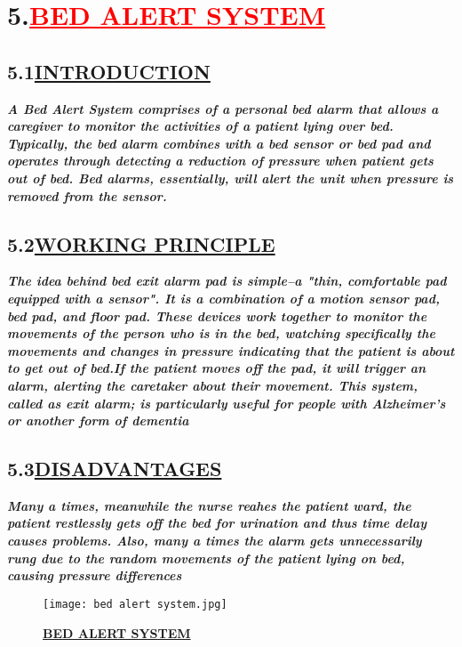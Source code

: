 \documentclass[12pt]{article}
\begin{document}
\section*{\textbf{5.\hspace{1cm}\textcolor{red}{\underline{\huge{BED ALERT SYSTEM}}}}}
\vspace{1cm}
\subsection*{\hspace{1cm}\textbf{5.1\hspace{1cm}\underline{\LARGE{INTRODUCTION}}}}
\hspace{1cm}\large{\emph{\textbf{ A Bed Alert System comprises of a personal bed alarm that allows a caregiver to monitor the activities of a patient lying over bed. Typically, the bed alarm combines with a bed sensor or bed pad and operates through detecting a reduction of pressure when patient gets out of bed. Bed alarms, essentially, will alert the unit when pressure is removed from the sensor.}}}
\vspace{2cm}
\subsection*{\hspace{1cm}\textbf{5.2\hspace{1cm}\underline{\LARGE{WORKING PRINCIPLE}}}}
\hspace{1cm}\large{\emph{\textbf{The idea behind bed exit alarm pad is simple–a "thin, comfortable pad equipped with a sensor". It is a combination of a motion sensor pad, bed pad, and floor pad. These devices work together to monitor the movements of the person who is in the bed, watching specifically the movements and changes in pressure indicating that the patient is about to get out of bed.If the patient moves off the pad, it will trigger an alarm, alerting the caretaker about their movement. This system, called as exit alarm; is particularly useful for people with Alzheimer's or another form of dementia}}}
\newpage
\subsection*{\hspace{1cm}\textbf{5.3\hspace{1cm}\underline{\LARGE{DISADVANTAGES}}}}
\hspace{1cm}\large{\emph{\textbf{Many a times, meanwhile the nurse reahes the patient ward, the patient restlessly gets off the bed for urination and thus time delay causes problems. Also, many a times the alarm gets unnecessarily rung due to the random movements of the patient lying on bed, causing pressure differences}}}
\begin{figure}
    \centering
    \texttt{[image: bed alert system.jpg]}
    \caption{\textbf{\underline{BED ALERT SYSTEM}}}
    \label{fig:5}
\end{figure}
\newpage
\end{document}
